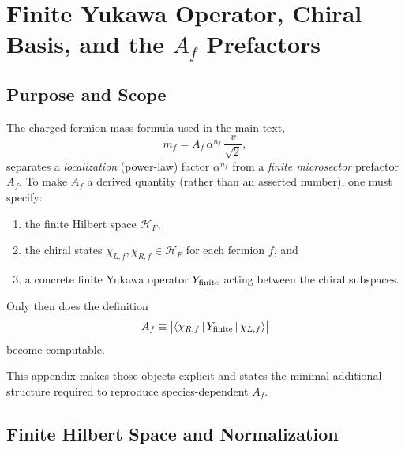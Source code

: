 
\section{Finite Yukawa Operator, Chiral Basis, and the $A_f$ Prefactors}
\label{app:Yfinite}

\subsection{Purpose and Scope}

The charged-fermion mass formula used in the main text,
\begin{equation}
m_f = A_f\,\alpha^{n_f}\,\frac{v}{\sqrt{2}},
\label{eq:mf_scaling_Y}
\end{equation}
separates a \emph{localization} (power-law) factor $\alpha^{n_f}$ from a \emph{finite microsector} 
prefactor $A_f$. To make $A_f$ a derived quantity (rather than an asserted number), one must specify:
\begin{enumerate}
\item[(i)] the finite Hilbert space $\mathcal{H}_F$,
\item[(ii)] the chiral states $\chi_{L,f}, \chi_{R,f} \in \mathcal{H}_F$ for each fermion $f$, and
\item[(iii)] a concrete finite Yukawa operator $Y_{\rm finite}$ acting between the chiral subspaces.
\end{enumerate}
Only then does the definition
\begin{equation}
A_f \equiv \big|\langle \chi_{R,f}\,|\,Y_{\rm finite}\,|\,\chi_{L,f}\rangle\big|
\label{eq:Af_def}
\end{equation}
become computable.

This appendix makes those objects explicit and states the minimal additional structure required 
to reproduce species-dependent $A_f$.

\subsection{Finite Hilbert Space and Normalization}

